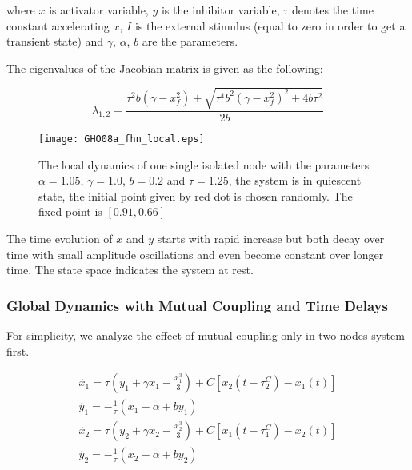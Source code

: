\documentclass[12pt]{article}
\begin{document}
where $x$ is activator variable, $y$ is the inhibitor variable, $\tau$ denotes the time constant accelerating $x$, $I$ is the external stimulus (equal to zero in order to get a transient state) and $\gamma$, $\alpha$, $b$ are the parameters. 

The eigenvalues of the Jacobian matrix is given as the following:

\begin{equation*}
\lambda_{1,2} = \dfrac{\tau^2 b (\gamma - x_f ^2) \pm \sqrt{\tau^4 b^2 (\gamma- x_f^2)^2 + 4b \tau^2 }} {2b}
\end{equation*}

\begin{figure}[h!]
	\centering
	\texttt{[image: GHO08a\_fhn\_local.eps]}
		\caption{The local dynamics of one single isolated node with the parameters $\alpha = 1.05$, $\gamma=1.0$, $b=0.2$ and $\tau = 1.25$, the system is in quiescent state, the initial point given by red dot is chosen randomly. The fixed point is $[0.91, 0.66]$}
\end{figure}

The time evolution of $x$ and $y$ starts with rapid increase but both decay over time with small amplitude oscillations and even become constant over longer time. The state space indicates the system at rest. 

\newpage

\subsubsection{Global Dynamics with Mutual Coupling and Time Delays}

For simplicity, we analyze the effect of mutual coupling only in two nodes system first. 

\begin{subequations}
 \begin{align}\dot{x_1} = \tau (y_1 + \gamma x_1 - \frac{x_1^3}{3}) + C [x_2(t-\tau_2^C)-x_1(t)] \label{eqn: frobenius 19}\\  \dot{y_1} = -\frac{1}{\tau} (x_1 - \alpha + b y_1) \label{eqn: frobenius 20} \\ \dot{x_2}=\tau (y_2 + \gamma x_2 - \frac{x_2^3}{3}) + C [x_1(t-\tau_1^C)-x_2(t)] \label{eqn: frobenius 21} \\  \dot{y_2} = -\frac{1}{\tau} (x_2 - \alpha + by_2) \label{eqn: frobenius 22}\end{align} 
\end{subequations}
\end{document}
